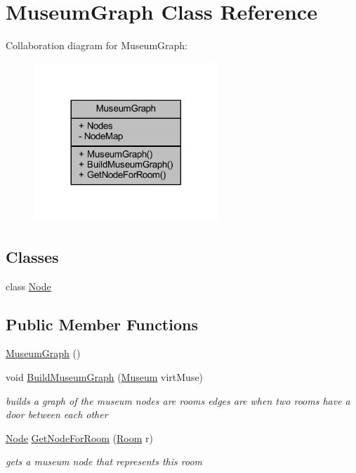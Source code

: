 \hypertarget{class_museum_graph}{}\section{Museum\+Graph Class Reference}
\label{class_museum_graph}


Collaboration diagram for Museum\+Graph\+:
\nopagebreak
\begin{figure}[H]
\begin{center}
\leavevmode
\includegraphics[width=197pt]{class_museum_graph__coll__graph}
\end{center}
\end{figure}
\subsection*{Classes}
\begin{DoxyCompactItemize}
\item 
class \mbox{\hyperlink{class_museum_graph_1_1_node}{Node}}
\end{DoxyCompactItemize}
\subsection*{Public Member Functions}
\begin{DoxyCompactItemize}
\item 
\mbox{\hyperlink{class_museum_graph_a36c6cda2e0045c0d501e6c1c5dc286bf}{Museum\+Graph}} ()
\item 
void \mbox{\hyperlink{class_museum_graph_a36a26248bb9c304f8e67c60eb6d517f5}{Build\+Museum\+Graph}} (\mbox{\hyperlink{class_museum}{Museum}} virt\+Muse)
\begin{DoxyCompactList}\small\item\em builds a graph of the museum nodes are rooms edges are when two rooms have a door between each other \end{DoxyCompactList}\item 
\mbox{\hyperlink{class_museum_graph_1_1_node}{Node}} \mbox{\hyperlink{class_museum_graph_a82509a5eb8dd2020aaee17261bedb974}{Get\+Node\+For\+Room}} (\mbox{\hyperlink{class_room}{Room}} r)
\begin{DoxyCompactList}\small\item\em gets a museum node that represents this room \end{DoxyCompactList}\end{DoxyCompactItemize}
